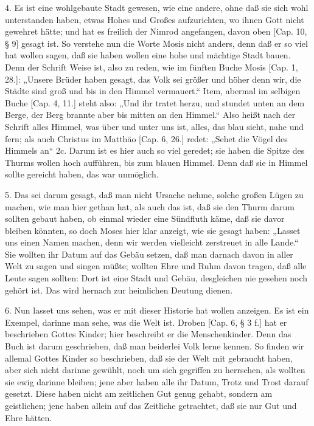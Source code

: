 4. Es ist eine wohlgebaute Stadt gewesen, wie eine andere, ohne daß sie sich wohl unterstanden haben, etwas Hohes und Großes aufzurichten, wo ihnen Gott nicht gewehret hätte; und hat es freilich der Nimrod angefangen, davon oben [Cap. 10, § 9] gesagt ist. So verstehe nun die Worte Mosis nicht anders, denn daß er so viel hat wollen sagen, daß sie haben wollen eine hohe und mächtige Stadt bauen. Denn der Schrift Weise ist, also zu reden, wie im fünften Buche Mosis [Cap. 1, 28.]: „Unsere Brüder haben gesagt, das Volk sei größer und höher denn wir, die Städte sind groß und bis in den Himmel vermauert.“ Item, abermal im selbigen Buche [Cap. 4, 11.] steht also: „Und ihr tratet herzu, und stundet unten an dem Berge, der Berg brannte aber bis mitten an den Himmel.“ Also heißt nach der Schrift alles Himmel,
was über und unter uns ist, alles, das blau sieht, nahe und fern; als auch Christus im Matthäo [Cap. 6, 26.] redet: „Sehet die Vögel des Himmels an“ 2c. Darum ist es hier auch so viel geredet; sie haben die Spitze des Thurms wollen hoch aufführen, bis zum blauen Himmel. Denn daß sie in Himmel sollte gereicht haben, das war unmöglich.

5. Das sei darum gesagt, daß man nicht Ursache nehme, solche großen Lügen zu machen, wie man hier gethan hat, als auch das ist, daß sie den Thurm darum sollten gebaut haben, ob einmal wieder eine Sündfluth käme, daß sie davor bleiben könnten, so doch Moses hier klar anzeigt, wie sie gesagt haben: „Lasset uns einen Namen machen, denn wir werden vielleicht zerstreuet in alle Lande.“ Sie wollten ihr Datum auf das Gebäu setzen, daß man darnach davon in aller Welt zu sagen und singen müßte; wollten Ehre und Ruhm davon tragen, daß alle Leute sagen sollten: Dort ist eine Stadt und Gebäu, desgleichen nie gesehen noch gehört ist. Das wird hernach zur heimlichen Deutung dienen.

6. Nun lasset uns sehen, was er mit dieser Historie hat wollen anzeigen. Es ist ein Exempel, darinne man sehe, was die Welt ist. Droben [Cap. 6, § 3 f.] hat er beschrieben Gottes Kinder; hier beschreibt er die Menschenkinder. Denn das Buch ist darum geschrieben, daß man beiderlei Volk lerne kennen. So finden wir allemal Gottes Kinder so beschrieben, daß sie der Welt mit gebraucht haben, aber sich nicht darinne gewühlt, noch um sich gegriffen zu herrschen, als wollten sie ewig darinne bleiben; jene aber haben alle ihr Datum, Trotz und Trost darauf gesetzt. Diese haben nicht am zeitlichen Gut genug gehabt, sondern am geistlichen; jene haben allein auf das Zeitliche getrachtet, daß sie nur Gut und Ehre hätten.

